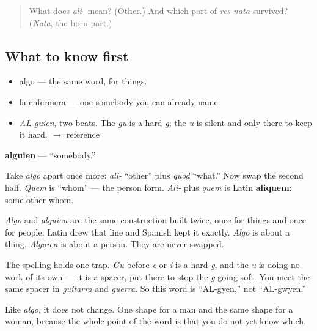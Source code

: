 \label{lesson:ES-C317-alguien}



\begin{quote}
What does \emph{ali-} mean? (Other.) And which part of \emph{res nata} survived? (\emph{Nata}, the born part.)
\end{quote}

\subsection*{What to know first}
\begin{itemize}
\raggedright
  \item algo — the same word, for things.
  \item la enfermera — one somebody you can already name.
\end{itemize}

\begin{sounds}
\begin{itemize}
\raggedright
  \item \emph{AL-guien}, two beats. The \emph{gu} is a hard \emph{g}; the \emph{u} is silent and only there to keep it hard. $\to$ reference
\end{itemize}
\end{sounds}

\begin{cousinweb}
\textbf{alguien} — \textquotedblleft{}somebody.\textquotedblright{}

Take \emph{algo} apart once more: \emph{ali-} \textquotedblleft{}other\textquotedblright{} plus \emph{quod} \textquotedblleft{}what.\textquotedblright{} Now swap the second half. \emph{Quem} is \textquotedblleft{}whom\textquotedblright{} — the person form. \emph{Ali-} plus \emph{quem} is Latin \textbf{aliquem}: some other whom.

\emph{Algo} and \emph{alguien} are the same construction built twice, once for things and once for people. Latin drew that line and Spanish kept it exactly. \emph{Algo} is about a thing. \emph{Alguien} is about a person. They are never swapped.

The spelling holds one trap. \emph{Gu} before \emph{e} or \emph{i} is a hard \emph{g}, and the \emph{u} is doing no work of its own — it is a spacer, put there to stop the \emph{g} going soft. You meet the same spacer in \emph{guitarra} and \emph{guerra}. So this word is \textquotedblleft{}AL-gyen,\textquotedblright{} not \textquotedblleft{}AL-gwyen.\textquotedblright{}

Like \emph{algo}, it does not change. One shape for a man and the same shape for a woman, because the whole point of the word is that you do not yet know which.
\end{cousinweb}

